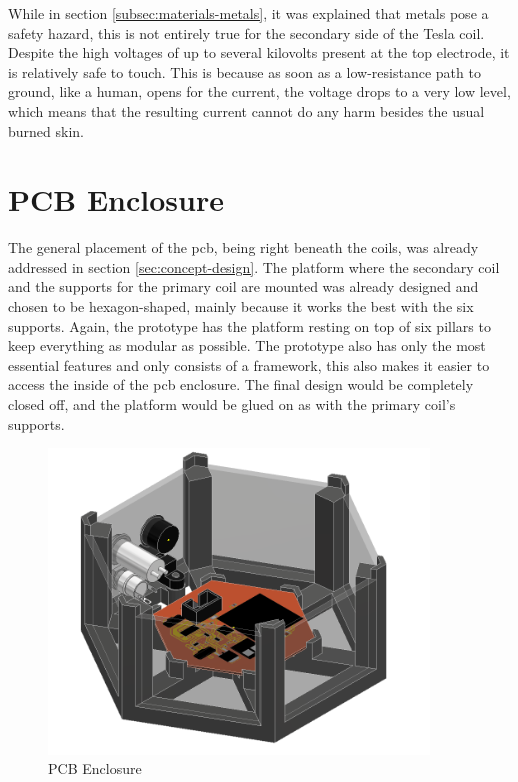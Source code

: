 While in section \ref{subsec:materials-metals}, it was explained that metals pose a safety hazard, this is not entirely true for the secondary side of the Tesla coil. Despite the high voltages of up to several kilovolts present at the top electrode, it is relatively safe to touch. This is because as soon as a low-resistance path to ground, like a human, opens for the current, the voltage drops to a very low level, which means that the resulting current cannot do any harm besides the usual burned skin.

\section{PCB Enclosure}

The general placement of the \gls{pcb}, being right beneath the coils, was already addressed in section \ref{sec:concept-design}. The platform where the secondary coil and the supports for the primary coil are mounted was already designed and chosen to be hexagon-shaped, mainly because it works the best with the six supports. Again, the prototype has the platform resting on top of six pillars to keep everything as modular as possible. The prototype also has only the most essential features and only consists of a framework, this also makes it easier to access the inside of the \gls{pcb} enclosure. The final design would be completely closed off, and the platform would be glued on as with the primary coil’s supports.

\begin{figure}[h!]
    \centering
    \includegraphics[width=0.9\textwidth]{kassandra/resources/JerJerWoBistDu.PNG}
    \caption{PCB Enclosure}
    \label{fig:bottom-bau}
\end{figure}

